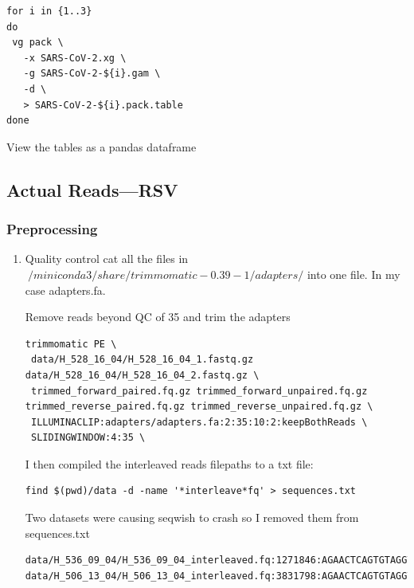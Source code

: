 \documentclass[a4paper]{article}
\begin{document}
\begin{verbatim}
for i in {1..3}
do 
 vg pack \
   -x SARS-CoV-2.xg \
   -g SARS-CoV-2-${i}.gam \
   -d \
   > SARS-CoV-2-${i}.pack.table
done
\end{verbatim}

View the tables as a pandas dataframe


\subsection{Actual Reads—RSV}
\label{sec:orgcd32994}
\subsubsection{Preprocessing}
\label{sec:orgc09113d}
\begin{enumerate}
\item Quality control
\label{sec:org6e4cb29}
cat all the files in \(~/miniconda3/share/trimmomatic-0.39-1/adapters/\) into one 
file. In my case adapters.fa.

Remove reads beyond QC of 35 and trim the adapters
\begin{verbatim}
trimmomatic PE \
 data/H_528_16_04/H_528_16_04_1.fastq.gz data/H_528_16_04/H_528_16_04_2.fastq.gz \
 trimmed_forward_paired.fq.gz trimmed_forward_unpaired.fq.gz trimmed_reverse_paired.fq.gz trimmed_reverse_unpaired.fq.gz \
 ILLUMINACLIP:adapters/adapters.fa:2:35:10:2:keepBothReads \
 SLIDINGWINDOW:4:35 \
\end{verbatim}

I then compiled the interleaved reads filepaths to a txt file:

\begin{verbatim}
find $(pwd)/data -d -name '*interleave*fq' > sequences.txt
\end{verbatim}
Two datasets were causing seqwish to crash so I removed them from sequences.txt

\begin{verbatim}
data/H_536_09_04/H_536_09_04_interleaved.fq:1271846:AGAACTCAGTGTAGGTAGAATGGTTGGCTGATCAATATCTCTAATGATTTTGGTCTGTGAATCAACTGTCATAAGAGAATTCTATCAAAGTTGAATTCCGAATCCTTGGGTCAATGACTGGGTGCACCCATTCTTCTAATGTGCTCTGTC
data/H_506_13_04/H_506_13_04_interleaved.fq:3831798:AGAACTCAGTGTAGGTAGAATGGTTGGCTGAGTAGGTAGATGGAGGCAGGTGCATGTGTGATGGGAAGTGTGGTGACGGGTTGTGTGGGCACACGGGATGAGGCGCAGATGGCTGGGGGTTTGGGAGGGGAATGGGTGGGAGAAGGAGGC
\end{verbatim}
\end{enumerate}
\end{document}
